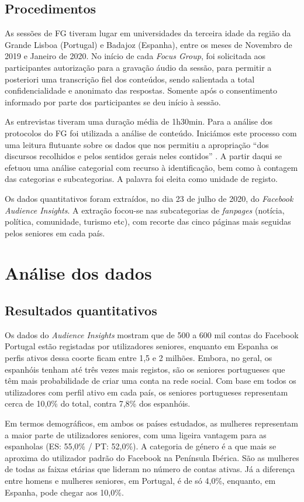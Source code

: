 \documentclass[portuguese]{textolivre}
\begin{document}
\subsection{Procedimentos}
As sessões de FG tiveram lugar em universidades da terceira idade da região da Grande Lisboa (Portugal) e Badajoz (Espanha), entre os meses de Novembro de 2019 e Janeiro de 2020. No início de cada \emph{Focus Group}, foi solicitada aos participantes autorização para a gravação áudio da sessão, para permitir a posteriori uma transcrição fiel dos conteúdos, sendo salientada a total confidencialidade e anonimato das respostas. Somente após o consentimento informado por parte dos participantes se deu início à sessão.

As entrevistas tiveram uma duração média de 1h30min. Para a análise dos protocolos do FG foi utilizada a análise de conteúdo. Iniciámos este processo com uma leitura flutuante sobre os dados que nos permitiu a apropriação “dos discursos recolhidos e pelos sentidos gerais neles contidos” \cite[p. 113]{morgan1996}. A partir daqui se efetuou uma análise categorial \cite{bardin2004} com recurso à identificação, bem como à contagem das categorias e subcategorias. A palavra foi eleita como unidade de registo.

Os dados quantitativos foram extraídos, no dia 23 de julho de 2020, do \emph{Facebook Audience Insights}. A extração focou-se nas subcategorias de \emph{fanpages} (notícia, política, comunidade, turismo etc), com recorte das cinco páginas mais seguidas pelos seniores em cada país.

\section{Análise dos dados}
\subsection{Resultados quantitativos}
Os dados do \emph{Audience Insights} mostram que de 500 a 600 mil contas do Facebook Portugal estão registadas por utilizadores seniores, enquanto em Espanha os perfis ativos dessa coorte ficam entre 1,5 e 2 milhões. Embora, no geral, os espanhóis tenham até três vezes mais registos, são os seniores portugueses que têm mais probabilidade de criar uma conta na rede social. Com base em todos os utilizadores com perfil ativo em cada país, os seniores portugueses representam cerca de 10,0\% do total, contra 7,8\% dos espanhóis.

Em termos demográficos, em ambos os países estudados, as mulheres representam a maior parte de utilizadores seniores, com uma ligeira vantagem para as espanholas (ES: 55,0\% / PT: 52,0\%). A categoria de género é a que mais se aproxima do utilizador padrão do Facebook na Península Ibérica. São as mulheres de todas as faixas etárias que lideram no número de contas ativas. Já a diferença entre homens e mulheres seniores, em Portugal, é de só 4,0\%, enquanto, em Espanha, pode chegar aos 10,0\%.
\end{document}
